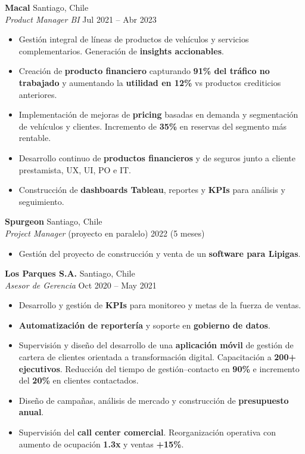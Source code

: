 \documentclass[a4paper,10.5pt]{extarticle}
\begin{document}
\textbf{Macal} \hfill Santiago, Chile\\
\textit{Product Manager BI} \hfill Jul 2021 -- Abr 2023
\begin{itemize}
    \item Gestión integral de líneas de productos de vehículos y servicios complementarios. Generación de \textbf{insights accionables}.
    \item Creación de \textbf{producto financiero} capturando \textbf{91\% del tráfico no trabajado} y aumentando la \textbf{utilidad en 12\%} vs productos crediticios anteriores.
    \item Implementación de mejoras de \textbf{pricing} basadas en demanda y segmentación de vehículos y clientes. Incremento de \textbf{35\%} en reservas del segmento más rentable.
    \item Desarrollo continuo de \textbf{productos financieros} y de seguros junto a cliente prestamista, UX, UI, PO e IT.
    \item Construcción de \textbf{dashboards Tableau}, reportes y \textbf{KPIs} para análisis y seguimiento.
\end{itemize}

\vspace{4pt}

\textbf{Spurgeon} \hfill Santiago, Chile\\
\textit{Project Manager} (proyecto en paralelo) \hfill 2022 (5 meses)
\begin{itemize}
    \item Gestión del proyecto de construcción y venta de un \textbf{software para Lipigas}.
\end{itemize}

\vspace{4pt}

\textbf{Los Parques S.A.} \hfill Santiago, Chile\\
\textit{Asesor de Gerencia} \hfill Oct 2020 -- May 2021
\begin{itemize}
    \item Desarrollo y gestión de \textbf{KPIs} para monitoreo y metas de la fuerza de ventas.
    \item \textbf{Automatización de reportería} y soporte en \textbf{gobierno de datos}.
    \item Supervisión y diseño del desarrollo de una \textbf{aplicación móvil} de gestión de cartera de clientes orientada a transformación digital. Capacitación a \textbf{200+ ejecutivos}. Reducción del tiempo de gestión--contacto en \textbf{90\%} e incremento del \textbf{20\%} en clientes contactados.
    \item Diseño de campañas, análisis de mercado y construcción de \textbf{presupuesto anual}.
    \item Supervisión del \textbf{call center comercial}. Reorganización operativa con aumento de ocupación \textbf{1.3x} y ventas \textbf{+15\%}.
\end{itemize}
\end{document}
